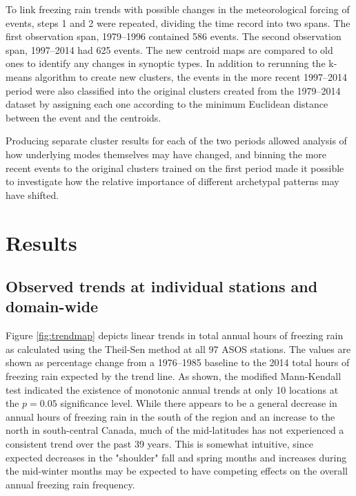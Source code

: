 \documentclass[twocol]{ametsoc}
\begin{document}
To link freezing rain trends with possible changes in the meteorological forcing of events, steps 1 and 2 were repeated, dividing the time record into two spans.   The first observation span, 1979--1996 contained 586 events.   The second observation span, 1997--2014 had 625 events.  The new centroid maps are compared to old ones to identify any changes in synoptic types. In addition to rerunning the k-means algorithm to create new clusters, the events in the more recent 1997--2014 period were also classified into the original clusters created from the 1979--2014 dataset by assigning each one according to the minimum Euclidean distance between the event and the centroids. 

Producing separate cluster results for each of the two periods allowed analysis of how underlying modes themselves may have changed, and binning the more recent events to the original clusters trained on the first period made it possible to investigate how the relative importance of different archetypal patterns may have shifted.

\section{Results}

\subsection{Observed trends at individual stations and domain-wide}


Figure \ref{fig:trendmap} depicts linear trends in total annual hours of freezing rain as calculated using the Theil-Sen method at all 97 ASOS stations. The values are shown as percentage change from a 1976--1985 baseline to the 2014 total hours of freezing rain expected by the trend line. As shown, the modified Mann-Kendall test indicated the existence of monotonic annual trends at only 10 locations at the $p=0.05$ significance level. While there appears to be a general decrease in annual hours of freezing rain in the south of the region and an increase to the north in south-central Canada, much of the mid-latitudes has not experienced a consistent trend over the past 39 years. This is somewhat intuitive, since expected decreases in the "shoulder" fall and spring months and increases during the mid-winter months may be expected to have competing effects on the overall annual freezing rain frequency.
\end{document}
